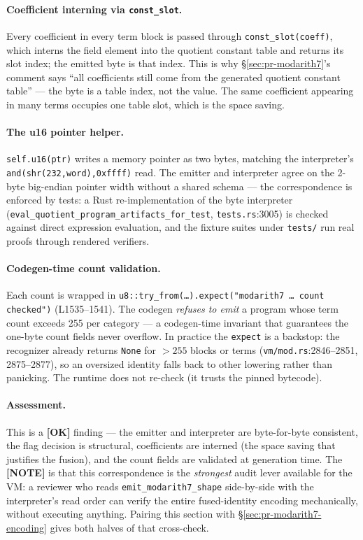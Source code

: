 \paragraph{Coefficient interning via \texttt{const\_slot}.}
Every coefficient in every term block is passed through
\texttt{const\_\allowbreak{}slot(coeff)}, which interns the field element into
the quotient constant table and returns its slot index; the emitted
byte is that index. This is why §\ref{sec:pr-modarith7}'s comment
says ``all coefficients still come from the generated quotient
constant table'' --- the byte is a table index, not the value.
The same coefficient appearing in many terms occupies one table
slot, which is the space saving.

\paragraph{The u16 pointer helper.}
\texttt{self.u16(ptr)} writes a memory pointer as two bytes,
matching the interpreter's \texttt{and(shr(232,word),0xffff)}
read. The emitter and interpreter agree on the 2-byte big-endian
pointer width without a shared schema --- the correspondence is
enforced by tests: a Rust re-implementation of the byte
interpreter (\texttt{eval\_\allowbreak{}quotient\_\allowbreak{}program\_\allowbreak{}artifacts\_\allowbreak{}for\_\allowbreak{}test},
\texttt{tests.rs}:3005) is checked against direct expression
evaluation, and the fixture suites under \texttt{tests/} run real
proofs through rendered verifiers.

\paragraph{Codegen-time count validation.}
Each count is wrapped in
\texttt{u8::try\_\allowbreak{}from(\ldots).expect("modarith7 \ldots{} count
checked")} (L1535--1541). The codegen \emph{refuses to emit} a
program whose term count exceeds 255 per category --- a
codegen-time invariant that guarantees the one-byte count fields
never overflow. In practice the \texttt{expect} is a backstop: the
recognizer already returns \texttt{None} for $>255$ blocks or
terms (\texttt{vm/mod.rs}:2846--2851, 2875--2877), so an oversized
identity falls back to other lowering rather than panicking. The
runtime does not re-check (it trusts the pinned bytecode).

\paragraph{Assessment.} This is a
\textcolor{tracegreen}{\textbf{[OK]}} finding --- the emitter and
interpreter are byte-for-byte consistent, the flag decision is
structural, coefficients are interned (the space saving that
justifies the fusion), and the count fields are validated at
generation time. The
\textcolor{mathpurple}{\textbf{[NOTE]}} is that this
correspondence is the \emph{strongest} audit lever available for
the VM: a reviewer who reads \texttt{emit\_\allowbreak{}modarith7\_\allowbreak{}shape}
side-by-side with the interpreter's read order can verify the
entire fused-identity encoding mechanically, without executing
anything. Pairing this section with
§\ref{sec:pr-modarith7-encoding} gives both halves of that
cross-check.


